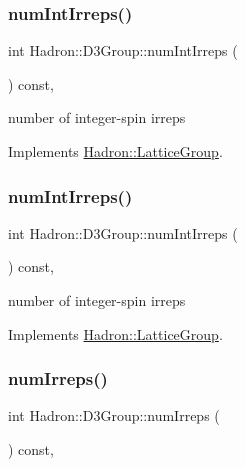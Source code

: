 \subsubsection{\texorpdfstring{numIntIrreps()}{numIntIrreps()}\hspace{0.1cm}{\footnotesize\ttfamily [2/3]}}
{\footnotesize\ttfamily int Hadron\+::\+D3\+Group\+::num\+Int\+Irreps (\begin{DoxyParamCaption}{ }\end{DoxyParamCaption}) const\hspace{0.3cm}{\ttfamily [inline]}, {\ttfamily [virtual]}}

number of integer-\/spin irreps 

Implements \mbox{\hyperlink{structHadron_1_1LatticeGroup_af2aa7b39222bf188389356eefcef7547}{Hadron\+::\+Lattice\+Group}}.

\mbox{\label{structHadron_1_1D3Group_a442d9bebc6eae854024be8123fda60d8}} 
\subsubsection{\texorpdfstring{numIntIrreps()}{numIntIrreps()}\hspace{0.1cm}{\footnotesize\ttfamily [3/3]}}
{\footnotesize\ttfamily int Hadron\+::\+D3\+Group\+::num\+Int\+Irreps (\begin{DoxyParamCaption}{ }\end{DoxyParamCaption}) const\hspace{0.3cm}{\ttfamily [inline]}, {\ttfamily [virtual]}}

number of integer-\/spin irreps 

Implements \mbox{\hyperlink{structHadron_1_1LatticeGroup_af2aa7b39222bf188389356eefcef7547}{Hadron\+::\+Lattice\+Group}}.

\mbox{\label{structHadron_1_1D3Group_a33e3822d1ec56e4928e5bc47b655f69f}} 
\subsubsection{\texorpdfstring{numIrreps()}{numIrreps()}\hspace{0.1cm}{\footnotesize\ttfamily [1/3]}}
{\footnotesize\ttfamily int Hadron\+::\+D3\+Group\+::num\+Irreps (\begin{DoxyParamCaption}{ }\end{DoxyParamCaption}) const\hspace{0.3cm}{\ttfamily [inline]}, {\ttfamily [virtual]}}

